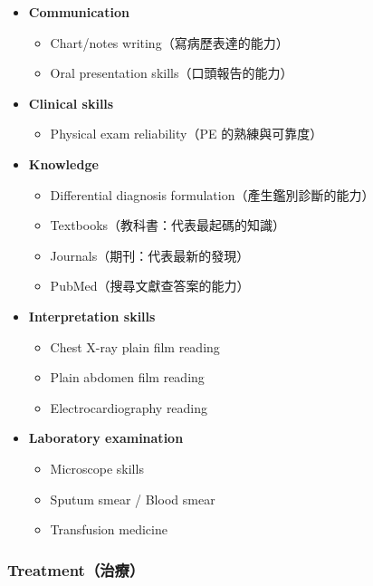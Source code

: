 \documentclass[12pt,a4paper]{article}
\begin{document}
\begin{itemize}
    \item \textbf{Communication}
    \begin{itemize}
        \item Chart/notes writing（寫病歷表達的能力）
        \item Oral presentation skills（口頭報告的能力）
    \end{itemize}

    \item \textbf{Clinical skills}
    \begin{itemize}
        \item Physical exam reliability（PE 的熟練與可靠度）
    \end{itemize}

    \item \textbf{Knowledge}
    \begin{itemize}
        \item Differential diagnosis formulation（產生鑑別診斷的能力）
        \item Textbooks（教科書：代表最起碼的知識）
        \item Journals（期刊：代表最新的發現）
        \item PubMed（搜尋文獻查答案的能力）
    \end{itemize}

    \item \textbf{Interpretation skills}
    \begin{itemize}
        \item Chest X-ray plain film reading
        \item Plain abdomen film reading
        \item Electrocardiography reading
    \end{itemize}

    \item \textbf{Laboratory examination}
    \begin{itemize}
        \item Microscope skills
        \item Sputum smear / Blood smear
        \item Transfusion medicine
    \end{itemize}
\end{itemize}

\subsubsection{Treatment（治療）}
\end{document}
